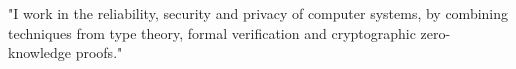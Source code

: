 "I work in the reliability, security and privacy of computer systems, by combining techniques from
type theory, formal verification and cryptographic zero-knowledge proofs."
